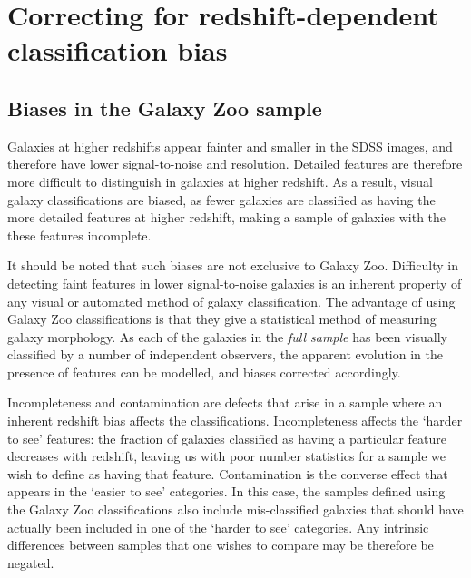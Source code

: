 \documentclass[useAMS,usenatbib]{mn2e}
\begin{document}
\section{Correcting for redshift-dependent classification bias}
\label{sec:redshift_bias}
\subsection{Biases in the Galaxy Zoo sample}
\label{sec:biases}

Galaxies at higher redshifts appear fainter and smaller in the SDSS images, and therefore have lower signal-to-noise and resolution. Detailed features are therefore more difficult to distinguish in galaxies at higher redshift. As a result, visual galaxy classifications are biased, as fewer galaxies are classified as having the more detailed features at higher redshift, making a sample of galaxies with the these features incomplete.

It should be noted that such biases are not exclusive to Galaxy Zoo. Difficulty in detecting faint features in lower signal-to-noise galaxies is an inherent property of any visual or automated method of galaxy classification. The advantage of using Galaxy Zoo classifications is that they give a statistical method of measuring galaxy morphology. As each of the galaxies in the \textit{full sample} has been visually classified by a number of independent observers, the apparent evolution in the presence of features can be modelled, and biases corrected accordingly.

Incompleteness and contamination are defects that arise in a sample where an inherent redshift bias affects the classifications. Incompleteness affects the `harder to see' features: the fraction of galaxies classified as having a particular feature decreases with redshift, leaving us with poor number statistics for a sample we wish to define as having that feature.  Contamination is the converse effect that appears in the `easier to see' categories.  In this case, the samples defined using the Galaxy Zoo classifications also include mis-classified galaxies that should have actually been included in one of the `harder to see' categories. Any intrinsic differences between samples that one wishes to compare may be therefore be negated.

\end{document}
